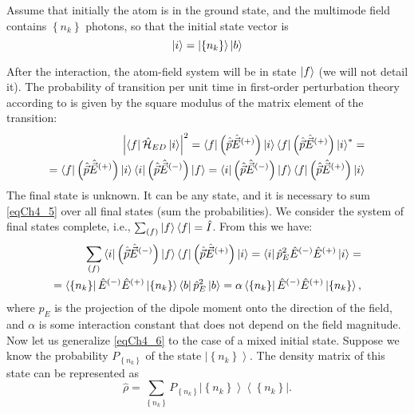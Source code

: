 Assume that initially the atom is in the ground state, and the multimode field contains $\left\{n_k\right\}$ photons, so that the initial state vector is
\begin{equation}
\ket{i} = \left|\left\{n_k\right\}\right> \ket{b}
\label{eqCh4_4}
\end{equation}

After the interaction, the atom-field system will be in state $\ket{f}$ (we will not detail it). The probability of transition per unit time in first-order perturbation theory according to  is given by the square modulus of the matrix element of the transition:
\begin{eqnarray}
\left|\bra{f}\hat{\mathcal{H}}_{ED}\ket{i}\right|^2 =
\bra{f}\left(\hat{\vec{p}}\hat{\vec{E}}^{(+)}\right)\ket{i}
\bra{f}\left(\hat{\vec{p}}\hat{\vec{E}}^{(+)}\right)\ket{i}^{*}
= 
\nonumber \\
=
\bra{f}\left(\hat{\vec{p}}\hat{\vec{E}}^{(+)}\right)\ket{i}
\bra{i}\left(\hat{\vec{p}}\hat{\vec{E}}^{(-)}\right)\ket{f}
=
\bra{i}\left(\hat{\vec{p}}\hat{\vec{E}}^{(-)}\right)\ket{f}
\bra{f}\left(\hat{\vec{p}}\hat{\vec{E}}^{(+)}\right)\ket{i}
\label{eqCh4_5}
\end{eqnarray}
The final state is unknown. It can be any state, and it is necessary to sum \eqref{eqCh4_5} over all final states (sum the probabilities). We consider the system of final states complete, i.e.,  
$\sum_{(f)} \ket{f}\bra{f} = \hat{I}$.
From this we have:
\begin{eqnarray}
\sum_{(f)}
\bra{i}\left(\hat{\vec{p}}\hat{\vec{E}}^{(-)}\right)\ket{f}
\bra{f}\left(\hat{\vec{p}}\hat{\vec{E}}^{(+)}\right)\ket{i}
= 
\bra{i}\hat{p}_E^2\hat{E}^{(-)}\hat{E}^{(+)}\ket{i} = 
\nonumber \\
=
\left<\left\{n_k\right\}\right|\hat{E}^{(-)}\hat{E}^{(+)}\left|\left\{n_k\right\}\right>\bra{b}\hat{p}_E^2\ket{b}
= 
\alpha \left<\left\{n_k\right\}\right|\hat{E}^{(-)}\hat{E}^{(+)}\left|\left\{n_k\right\}\right>,
\label{eqCh4_6}
\end{eqnarray}
where $\hat{p}_E$ is the projection of the dipole moment onto the direction of the field, and $\alpha$ is some interaction constant that does not depend on the field magnitude. Now let us generalize \eqref{eqCh4_6} to the case of a mixed initial state. Suppose we know the probability $P_{\left\{n_k\right\}}$ of the state $\left|\left\{n_k\right\}\right>$.
The density matrix 
of this state can be represented as
\begin{equation}
\hat{\rho} = \sum_{\left\{n_k\right\}}P_{\left\{n_k\right\}}
\left|\left\{n_k\right\}\right>\left<\left\{n_k\right\}\right|.
\label{eqCh4_7}
\end{equation}

